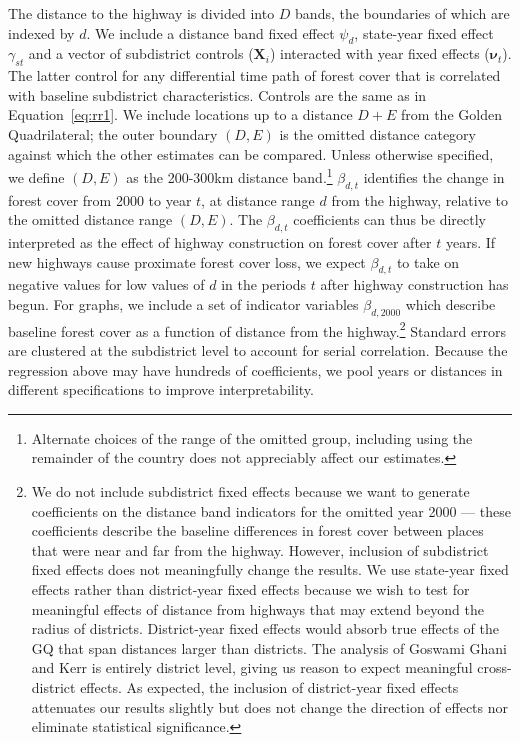 \noindent The distance to the highway is divided into $D$ bands, the boundaries
of which are indexed by $d$. 
We include a distance band
fixed effect $\psi_d$, state-year fixed
effect $\gamma_{st}$ and a vector of subdistrict controls
($\boldsymbol X_i$) interacted with year fixed effects ($\boldsymbol
\nu_t$). The latter control for any differential time path of forest cover
that is correlated with baseline subdistrict characteristics.  Controls are
the same as in Equation~\ref{eq:rr1}. 
We include
locations up to a distance $D+E$ from the Golden Quadrilateral; the outer
boundary $(D,E)$ is the omitted distance category against which the other
estimates can be compared. Unless otherwise specified, we define $(D,E)$
as the 200-300km distance band.\footnote{Alternate choices of the
  range of the omitted group, including using the remainder of the
  country does not appreciably affect our estimates.}  $\beta_{d,t}$
identifies the change in forest cover from 2000 to year $t$, at
distance range $d$ from the highway, relative to the omitted distance
range $(D,E)$. The $\beta_{d,t}$ coefficients can thus be directly
interpreted as the effect of highway construction on forest cover
after $t$ years.  If new highways cause proximate forest cover loss,
we expect $\beta_{d,t}$ to take on negative values for low values of
$d$ in the periods $t$ after highway construction has begun. For
graphs, we include a set of indicator variables $\beta_{d,2000}$ which
describe baseline forest cover as a function of distance from the
highway.\footnote{We do not include subdistrict fixed effects because
  we want to generate coefficients on the distance band indicators for
  the omitted year 2000 --- these coefficients describe the baseline
  differences in forest cover between places that were near and far
  from the highway. However, inclusion of subdistrict fixed effects
  does not meaningfully change the results. We use state-year fixed
  effects rather than district-year fixed effects because we wish to
  test for meaningful effects of distance from highways that may
  extend beyond the radius of districts. District-year fixed effects
  would absorb true effects of the GQ that span distances larger than
  districts. The analysis of Goswami Ghani and Kerr \cite{GGK16} is
  entirely district level, giving us reason to expect meaningful
  cross-district effects. As expected, the inclusion of district-year
  fixed effects attenuates our results slightly but does not change
  the direction of effects nor eliminate statistical significance.}
Standard errors are clustered at the subdistrict level to account for
serial correlation. Because the regression above may have hundreds of
coefficients, we pool years or distances in different specifications
to improve interpretability.

